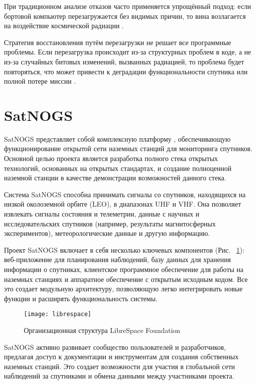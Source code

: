 При традиционном анализе отказов часто применяется упрощённый подход: если бортовой компьютер перезагружается без видимых причин, то вина возлагается на воздействие космической радиации \cite{maurer2008harsh}.

Стратегия восстановления путём перезагрузки не решает все программные проблемы. Если перезагрузка происходит из-за структурных проблем в коде, а не из-за случайных битовых изменений, вызванных радиацией, то проблема будет повторяться, что может привести к деградации функциональности спутника или полной потере миссии \cite{lee2019dependable}.


\section{SatNOGS}

SatNOGS представляет собой комплексную платформу \cite{satnogs_general_docs},
обеспечивающую функционирование открытой сети наземных станций для мониторинга
спутников. Основной целью проекта является разработка полного стека открытых
технологий, основанных на открытых стандартах, и создание полноценной наземной
станции в качестве демонстрации возможностей данного стека.

Система SatNOGS способна принимать сигналы со спутников, находящихся на низкой
околоземной орбите (LEO), в диапазонах UHF и VHF. Она позволяет извлекать
сигналы состояния и телеметрии, данные с научных и исследовательских спутников
(например, результаты магнитосферных экспериментов), метеорологические данные и
другую информацию.

Проект SatNOGS включает в себя несколько ключевых компонентов (Рис. ~\ref{fig:librespace}): веб-приложение
для планирования наблюдений, базу данных для хранения информации о спутниках,
клиентское программное обеспечение для работы на наземных станциях и аппаратное
обеспечение с открытым исходным кодом. Все это создает модульную архитектуру,
позволяющую легко интегрировать новые функции и расширять функциональность
системы.

\begin{figure}[ht]
	\centering
	\texttt{[image: librespace]}
	\caption{Организационная структура LibreSpace Foundation}
	\label{fig:librespace}
\end{figure}

SatNOGS активно развивает сообщество пользователей и разработчиков, предлагая
доступ к документации и инструментам для создания собственных наземных станций.
Это создает возможности для участия в глобальной сети наблюдений за спутниками
и обмена данными между участниками проекта.

